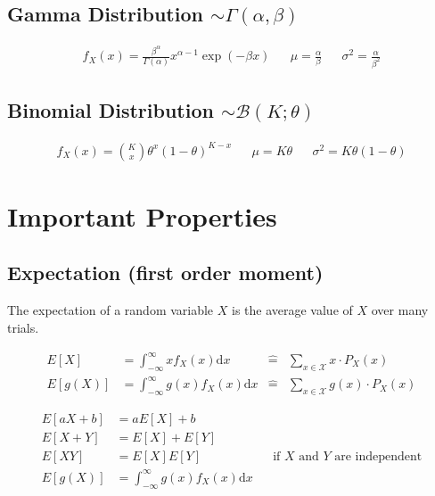 \begin{mdframed}[style=eqbox]
  \subsection{Gamma Distribution $\sim \Gamma(\alpha, \beta)$}
  \begin{align*}
    f_X(x) = \frac{\beta^\alpha}{\Gamma(\alpha)} x^{\alpha-1} \exp(-\beta x) && \mu = \frac{\alpha}{\beta} && \sigma^2 = \frac{\alpha}{\beta^2}
  \end{align*}
\end{mdframed}

\begin{mdframed}[style=eqbox]
  \subsection{Binomial Distribution $\sim \mathcal{B}(K;\theta)$}
  \begin{align*}
    f_X(x) = \binom{K}{x} \theta^x (1-\theta)^{K-x} && \mu = K \theta && \sigma^2 = K \theta (1-\theta)
  \end{align*}
\end{mdframed}

\section{Important Properties}
\begin{mdframed}[style=eqbox]
  \subsection{Expectation (first order moment)}
  The expectation of a random variable $X$ is the average value of $X$ over many trials.
  \begin{mdframed}[style=redbox]
    \begin{align*}
      E[X] &= \int_{-\infty}^{\infty} x f_X(x) \text{d}x &\hat{ =}& \sum_{x \in \mathcal{X}} x \cdot P_X(x)\\
      E[g(X)] &= \int_{-\infty}^{\infty} g(x) f_X(x) \text{d}x &\hat{ =}& \sum_{x \in \mathcal{X}} g(x) \cdot P_X(x)
  \end{align*}
  \end{mdframed}
  \begin{align*}
    E[aX + b] &= aE[X] + b\\
    E[X + Y] &= E[X] + E[Y]\\
    E[XY] &= E[X]E[Y] && \text{if~} X \text{~and~} Y \text{~are independent}\\
    E[g(X)] &= \int_{-\infty}^{\infty} g(x) f_X(x) \text{d}x
  \end{align*}
\end{mdframed}

